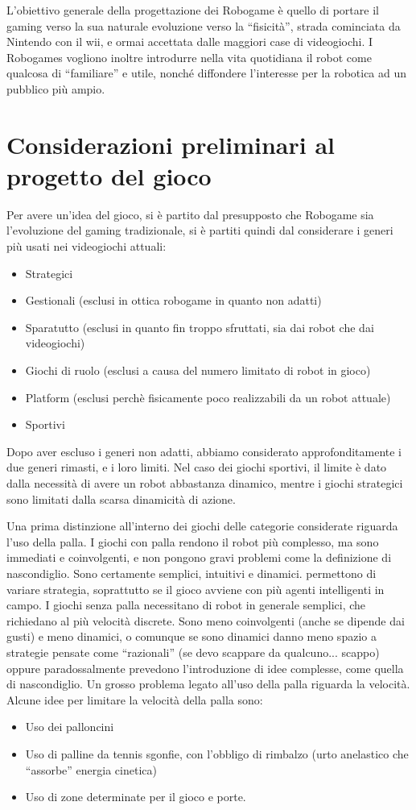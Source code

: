L'obiettivo generale della progettazione dei Robogame è quello di portare il gaming verso la sua naturale evoluzione verso la ``fisicità'', strada cominciata da Nintendo con il wii, e ormai accettata dalle maggiori case di videogiochi. I Robogames vogliono inoltre introdurre nella vita quotidiana il robot come qualcosa di ``familiare'' e utile, nonché diffondere l'interesse per la robotica ad un pubblico più ampio.

\section{Considerazioni preliminari al progetto del gioco}
Per avere un’idea del gioco, si è partito dal presupposto che Robogame sia l’evoluzione del gaming tradizionale, si è partiti quindi dal considerare i generi più usati nei videogiochi attuali:
\begin{itemize}
\item Strategici
\item Gestionali (esclusi in ottica robogame in quanto non adatti)
\item Sparatutto (esclusi in quanto fin troppo sfruttati, sia dai robot che dai videogiochi)
\item Giochi di ruolo (esclusi a causa del numero limitato di robot in gioco)
\item Platform (esclusi perchè fisicamente poco realizzabili da un robot attuale)
\item Sportivi
\end{itemize}
Dopo aver escluso i generi non adatti, abbiamo considerato approfonditamente i due generi rimasti, e i loro limiti. Nel caso dei giochi sportivi, il limite è dato dalla necessità di avere un robot abbastanza dinamico, mentre i giochi strategici sono limitati dalla scarsa dinamicità di azione.

Una prima distinzione all'interno dei giochi delle categorie considerate riguarda l'uso della palla.
I giochi con palla rendono il robot più complesso, ma sono immediati e coinvolgenti, e non pongono gravi problemi come la definizione di nascondiglio. Sono certamente semplici, intuitivi e dinamici. permettono di variare strategia, soprattutto se il gioco avviene con più agenti intelligenti in campo.
I giochi senza palla necessitano di robot in generale semplici, che richiedano al più velocità discrete. Sono meno coinvolgenti (anche se dipende dai gusti) e meno dinamici, o comunque se sono dinamici danno meno spazio a strategie pensate come “razionali” (se devo scappare da qualcuno... scappo) oppure paradossalmente prevedono l’introduzione di idee complesse, come quella di nascondiglio.
Un grosso problema legato all'uso della palla riguarda la velocità. Alcune idee per limitare la velocità della palla sono:
\begin{itemize}
\item Uso dei palloncini
\item Uso di palline da tennis sgonfie, con l’obbligo di rimbalzo (urto anelastico che “assorbe” energia cinetica)
\item Uso di zone determinate per il gioco e porte.
\end{itemize}

